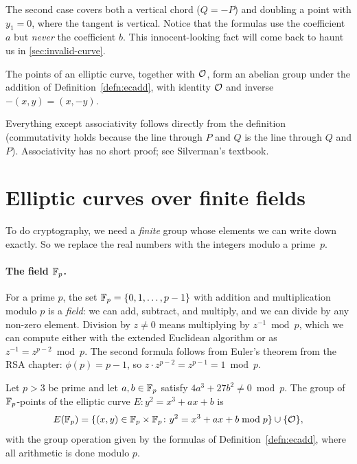The second case covers both a vertical chord ($Q = -P$) and doubling a
point with $y_1 = 0$, where the tangent is vertical.
Notice that the formulas use the coefficient $a$ but \emph{never} the
coefficient $b$.
This innocent-looking fact will come back to haunt us in
\cref{sec:invalid-curve}.

\begin{theorem}
The points of an elliptic curve, together with $\mathcal{O}$, form an abelian
group under the addition of Definition~\ref{defn:ecadd}, with identity $\mathcal{O}$ and
inverse $-(x, y) = (x, -y)$.
\end{theorem}

Everything except associativity follows directly from the definition
(commutativity holds because the line through $P$ and $Q$ is the line
through $Q$ and $P$). Associativity has no short proof; see Silverman's
textbook.\autocite{Silverman09}

\section{Elliptic curves over finite fields}

To do cryptography, we need a \emph{finite} group whose elements we can
write down exactly.
So we replace the real numbers with the integers modulo a prime~$p$.

\paragraph{The field $\mathbb{F}_p$.}
For a prime $p$, the set $\mathbb{F}_p = \{0, 1, \dots, p-1\}$ with addition and
multiplication modulo $p$ is a \emph{field}: we can add, subtract, and
multiply, and we can divide by any non-zero element.
Division by $z \neq 0$ means multiplying by $z^{-1} \bmod p$, which we can
compute either with the extended Euclidean algorithm or as
$z^{-1} = z^{p-2} \bmod p$.
The second formula follows from Euler's theorem from the RSA chapter:
$\phi(p) = p - 1$, so $z \cdot z^{p-2} = z^{p-1} = 1 \bmod p$.

\begin{definition}
Let $p > 3$ be prime and let $a, b \in \mathbb{F}_p$ satisfy
$4a^3 + 27b^2 \neq 0 \bmod p$. The group of $\mathbb{F}_p$-points of the
elliptic curve $E \colon y^2 = x^3 + ax + b$ is
\[ E(\mathbb{F}_p) = \{ (x, y) \in \mathbb{F}_p \times \mathbb{F}_p \colon y^2 = x^3 + ax + b \bmod p \}
            \cup \{ \mathcal{O} \}, \]
with the group operation given by the formulas of Definition~\ref{defn:ecadd},
where all arithmetic is done modulo $p$.
\end{definition}


